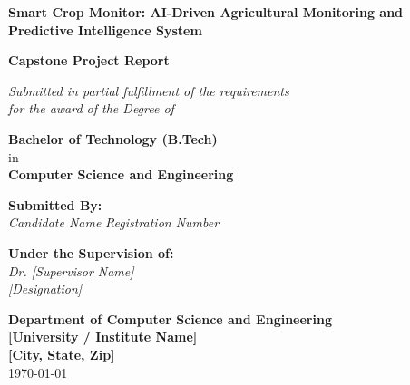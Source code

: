 \documentclass[12pt, a4paper]{report}
\begin{document}
\begin{titlepage}
    \centering
    \vspace*{2cm}
    
    \Huge
    \textbf{Smart Crop Monitor: AI-Driven Agricultural Monitoring and Predictive Intelligence System}
    
    \vspace{2cm}
    \Large
    \textbf{Capstone Project Report}
    
    \vspace{1.5cm}
    \normalsize
    \textit{Submitted in partial fulfillment of the requirements \\ for the award of the Degree of}
    
    \vspace{0.5cm}
    \Large
    \textbf{Bachelor of Technology (B.Tech)}
    \\ in \\
    \textbf{Computer Science and Engineering}
    
    \vspace{2cm}
    
    \textbf{Submitted By:}\\
    \vspace{0.5cm}
    \textit{Candidate Name} \hspace{1cm} \textit{Registration Number}
    
    \vfill
    
    \textbf{Under the Supervision of:}\\
    \textit{Dr. [Supervisor Name]}\\
    \textit{[Designation]}
    
    \vspace{1.5cm}
    
    \textbf{Department of Computer Science and Engineering}\\
    \textbf{[University / Institute Name]}\\
    \textbf{[City, State, Zip]}\\
    \today
    
\end{titlepage}
\end{document}
